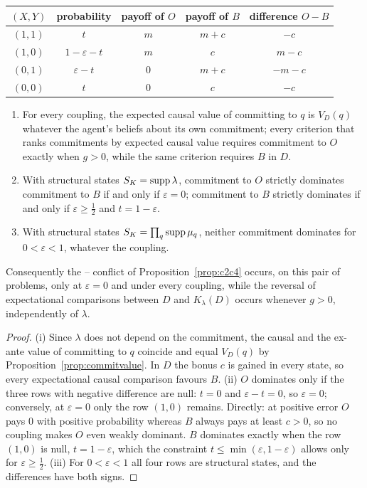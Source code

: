 \begin{center}
\small
\begin{tabular}{@{}ccccc@{}}
  \toprule
  $(X,Y)$ & probability & payoff of $O$ & payoff of $B$ & difference $O-B$ \\
  \midrule
  $(1,1)$ & $t$ & $m$ & $m+c$ & $-c$ \\
  $(1,0)$ & $1-\varepsilon-t$ & $m$ & $c$ & $m-c$ \\
  $(0,1)$ & $\varepsilon-t$ & $0$ & $m+c$ & $-m-c$ \\
  $(0,0)$ & $t$ & $0$ & $c$ & $-c$ \\
  \bottomrule
\end{tabular}
\end{center}

\begin{proposition}\label{prop:noisycommit}
\begin{enumerate}[label=(\roman*)]
  \item For every coupling, the expected causal value of committing to $q$ is $V_D(q)$ whatever the
        agent's beliefs about its own commitment; every criterion that ranks commitments by expected
        causal value requires commitment to $O$ exactly when $g>0$, while the same criterion requires
        $B$ in $D$.
  \item With structural states $S_K=\operatorname{supp}\lambda$, commitment to $O$ strictly dominates commitment to $B$
        if and only if $\varepsilon=0$; commitment to $B$ strictly dominates if and only if
        $\varepsilon\ge\tfrac12$ and $t=1-\varepsilon$.
  \item With structural states $S_K=\prod_q\operatorname{supp}\mu_q$, neither commitment dominates for
        $0<\varepsilon<1$, whatever the coupling.
\end{enumerate}
Consequently the -- conflict of Proposition~\ref{prop:c2c4} occurs, on this pair of
problems, only at $\varepsilon=0$ and under every coupling, while the reversal of expectational
comparisons between $D$ and $K_\lambda(D)$ occurs whenever $g>0$, independently of $\lambda$.
\end{proposition}

\begin{proof}
(i) Since $\lambda$ does not depend on the commitment, the causal and the ex-ante value of committing
to $q$ coincide and equal $V_D(q)$ by Proposition~\ref{prop:commitvalue}. In $D$ the bonus $c$ is
gained in every state, so every expectational causal comparison favours $B$. (ii) $O$ dominates
only if the three rows with negative difference are null: $t=0$ and $\varepsilon-t=0$, so
$\varepsilon=0$; conversely, at $\varepsilon=0$ only the row $(1,0)$ remains. Directly: at positive error
$O$ pays $0$ with positive probability whereas $B$ always pays at least $c>0$, so no coupling makes
$O$ even weakly dominant. $B$ dominates exactly when the row $(1,0)$ is null, $t=1-\varepsilon$, which
the constraint $t\le\min(\varepsilon,1-\varepsilon)$ allows only for $\varepsilon\ge\tfrac12$. (iii) For
$0<\varepsilon<1$ all four rows are structural states, and the differences have both signs.
\end{proof}

